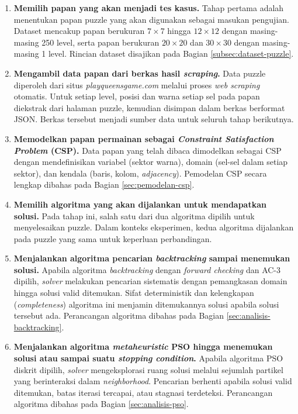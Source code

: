 \begin{enumerate}
	\item \textbf{Memilih papan yang akan menjadi tes kasus.} Tahap pertama adalah menentukan papan puzzle yang akan digunakan sebagai masukan pengujian. Dataset mencakup papan berukuran $7 \times 7$ hingga $12 \times 12$ dengan masing-masing 250 level, serta papan berukuran $20 \times 20$ dan $30 \times 30$ dengan masing-masing 1 level. Rincian dataset disajikan pada Bagian \ref{subsec:dataset-puzzle}.
	
	\item \textbf{Mengambil data papan dari berkas hasil \textit{scraping}.} Data puzzle diperoleh dari situs \textit{playqueensgame.com} melalui proses \textit{web scraping} otomatis. Untuk setiap level, posisi dan warna setiap sel pada papan diekstrak dari halaman puzzle, kemudian disimpan dalam berkas berformat JSON. Berkas tersebut menjadi sumber data untuk seluruh tahap berikutnya.
	
	\item \textbf{Memodelkan papan permainan sebagai \textit{Constraint Satisfaction Problem} (CSP).} Data papan yang telah dibaca dimodelkan sebagai CSP dengan mendefinisikan variabel (sektor warna), domain (sel-sel dalam setiap sektor), dan kendala (baris, kolom, \textit{adjacency}). Pemodelan CSP secara lengkap dibahas pada Bagian \ref{sec:pemodelan-csp}.
	
	\item \textbf{Memilih algoritma yang akan dijalankan untuk mendapatkan solusi.} Pada tahap ini, salah satu dari dua algoritma dipilih untuk menyelesaikan puzzle. Dalam konteks eksperimen, kedua algoritma dijalankan pada puzzle yang sama untuk keperluan perbandingan.
	
	\item \textbf{Menjalankan algoritma pencarian \textit{backtracking} sampai menemukan solusi.} Apabila algoritma \textit{backtracking} dengan \textit{forward checking} dan AC-3 dipilih, \textit{solver} melakukan pencarian sistematis dengan pemangkasan domain hingga solusi valid ditemukan. Sifat deterministik dan kelengkapan (\textit{completeness}) algoritma ini menjamin ditemukannya solusi apabila solusi tersebut ada. Perancangan algoritma dibahas pada Bagian \ref{sec:analisis-backtracking}.
	
	\item \textbf{Menjalankan algoritma \textit{metaheuristic} PSO hingga menemukan solusi atau sampai suatu \textit{stopping condition}.} Apabila algoritma PSO diskrit dipilih, \textit{solver} mengeksplorasi ruang solusi melalui sejumlah partikel yang berinteraksi dalam \textit{neighborhood}. Pencarian berhenti apabila solusi valid ditemukan, batas iterasi tercapai, atau stagnasi terdeteksi. Perancangan algoritma dibahas pada Bagian \ref{sec:analisis-pso}.
	

\end{enumerate}
